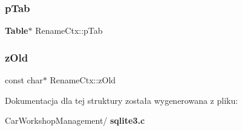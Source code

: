 \subsubsection{pTab}
{\footnotesize\ttfamily \textbf{ Table}$\ast$ Rename\+Ctx\+::p\+Tab}

\mbox{\label{struct_rename_ctx_a78aef66b26647db09848f45ae245ff2a}} 
\subsubsection{zOld}
{\footnotesize\ttfamily const char$\ast$ Rename\+Ctx\+::z\+Old}



Dokumentacja dla tej struktury została wygenerowana z pliku\+:\begin{DoxyCompactItemize}
\item 
Car\+Workshop\+Management/\textbf{ sqlite3.\+c}\end{DoxyCompactItemize}
